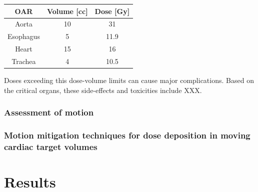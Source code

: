 \documentclass[type=dr, dr=rernat, accentcolor=tud7b,colorbacktitle, bigchapter, openright, twoside, 12pt ]{tudthesis}
\begin{document}
\begin{center}
  \begin{tabular}{ | c || c | c |}
    \hline
    OAR & Volume [cc] & Dose [Gy]\\ \hline \hline
    Aorta & 10 & 31 \\ \hline
    Esophagus & 5 & 11.9 \\ \hline
    Heart & 15 & 16 \\ \hline
    Trachea & 4 & 10.5 \\ 
    \hline
  \end{tabular}
  \label{DVLimits}
\end{center}

Doses exceeding this dose-volume limits can cause major complications. Based on the critical organs, these side-effects and toxicities include 
XXX. 

\subsubsection{Assessment of motion}


\subsubsection{Motion mitigation techniques for dose deposition in moving cardiac target volumes}

\newpage

\section{Results}
\end{document}
